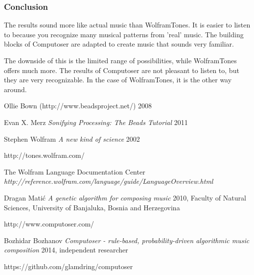 \documentclass[12pt]{article}
\begin{document}
\newpage

\subsubsection{Conclusion}

The results sound more like actual music than WolframTones. It is easier to listen to because you recognize many musical patterns from 'real' music. The building blocks of Computoser are adapted to create music that sounds very familiar.
\newline

The downside of this is the limited range of possibilities, while WolframTones offers much more. The results of Computoser are not pleasant to listen to, but they are very recognizable. In the case of WolframTones, it is the other way around.  
\newpage

\begin{thebibliography}{1}

 Ollie Bown (http://www.beadsproject.net/) 2008

 Evan X. Merz {\em Sonifying Processing: The Beads Tutorial} 2011

 Stephen Wolfram {\em A new kind of science} 2002

 http://tones.wolfram.com/

 The Wolfram Language Documentation Center {\em http://reference.wolfram.com/language/guide/LanguageOverview.html}

 Dragan Mati\'c {\em A genetic algorithm for composing music} 2010, Faculty of Natural Sciences, University of Banjaluka, Bosnia and Herzegovina

 http://www.computoser.com/

 Bozhidar Bozhanov {\em Computoser - rule-based, probability-driven algorithmic music composition} 2014,  independent researcher

 https://github.com/glamdring/computoser

\end{thebibliography}
\end{document}
